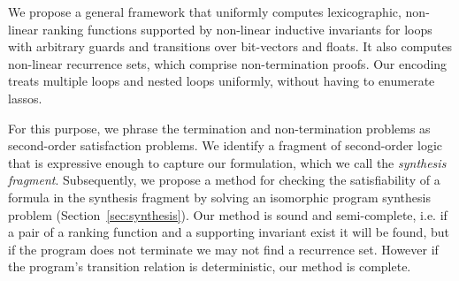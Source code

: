 \documentclass[preprint]{sigplanconf}
\theoremstyle{definition}
\newcommand{\todo}[1]{{\bf TODO:} #1}
\begin{document}




We propose a general framework that uniformly computes lexicographic,
non-linear ranking functions supported by non-linear inductive invariants
for loops with arbitrary guards and transitions over bit-vectors and floats. 
It also computes non-linear recurrence sets, which comprise non-termination
proofs.  Our encoding treats multiple loops and nested loops uniformly,
without having to enumerate lassos.
%

 For this purpose, we phrase the termination and non-termination problems as
second-order satisfaction problems.  We identify a fragment of second-order
logic that is expressive enough to capture our formulation, which we call
the \emph{synthesis fragment}.  Subsequently, we propose a method for
checking the satisfiability of a formula in the synthesis fragment by
solving an isomorphic program synthesis problem
(Section~\ref{sec:synthesis}).  Our method is sound and semi-complete, i.e. 
if a pair of a ranking function and a supporting invariant exist it will be
found, but if the program does not terminate we may not find a recurrence
set.  However if the program's transition relation is deterministic, our
method is complete.
\end{document}

